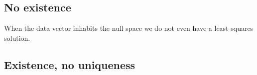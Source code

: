 \subsection{No existence}
When the data vector inhabits the null space we do not even have a least squares solution. 

\subsection{Existence, no uniqueness}



\endinput  %